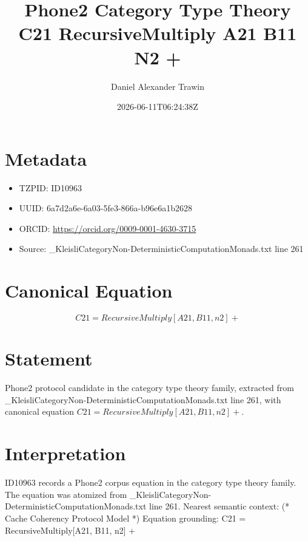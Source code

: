 \documentclass[11pt]{article}
\title{Phone2 Category Type Theory C21 RecursiveMultiply A21 B11 N2 +}
\author{Daniel Alexander Trawin}
\date{2026-06-11T06:24:38Z}
\begin{document}
\maketitle
\section*{Metadata}
\begin{itemize}
\item TZPID: ID10963
\item UUID: 6a7d2a6e-6a03-5fe3-866a-b96e6a1b2628
\item ORCID: \url{https://orcid.org/0009-0001-4630-3715}
\item Source: _KleisliCategoryNon-DeterministicComputationMonads.txt line 261
\end{itemize}
\section*{Canonical Equation}
\[
C21 = RecursiveMultiply[A21, B11, n2] +
\]
\section*{Statement}
Phone2 protocol candidate in the category type theory family, extracted from _KleisliCategoryNon-DeterministicComputationMonads.txt line 261, with canonical equation $C21 = RecursiveMultiply[A21, B11, n2] +$.
\section*{Interpretation}
ID10963 records a Phone2 corpus equation in the category type theory family. The equation was atomized from _KleisliCategoryNon-DeterministicComputationMonads.txt line 261. Nearest semantic context: (* Cache Coherency Protocol Model *) Equation grounding: C21 = RecursiveMultiply[A21, B11, n2] +
\end{document}
